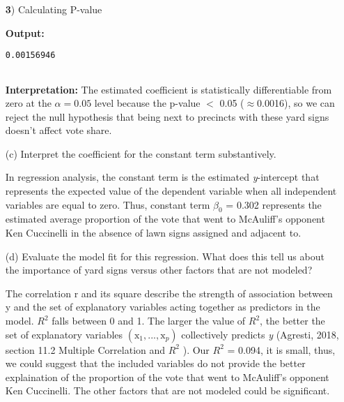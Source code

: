 \documentclass[12pt,letterpaper]{article}
\begin{document}
\begin{enumerate}
\begin{verbatim}
\end{verbatim}  
\vspace{.25cm}

\noindent \textbf 3) Calculating P-value
\vspace{0.5cm}


  
\vspace{.25cm}

\noindent \textbf{Output: }
\begin{verbatim}
0.00156946
	
\end{verbatim}  
\vspace{.25cm}

\noindent \textbf{Interpretation:} The estimated coefficient is statistically differentiable from zero at the $\alpha=0.05$ level because the p-value $<$ 0.05 ($\approx $0.0016), so we can reject the null hypothesis that being next to precincts with these yard signs doesn't affect vote share. \vspace{.5cm}
		

	\item [(c)] Interpret the coefficient for the constant term substantively.
	\vspace{0.5 cm}
	
	\noindent In regression analysis, the constant term is the estimated \textit{y}-intercept that represents the expected value of the dependent variable when all independent variables are equal to zero. Thus, constant term $ \beta_0 $ = 0.302 represents the estimated average proportion of the vote that went to McAuliff’s opponent Ken Cuccinelli in the absence of lawn signs assigned and adjacent to.
	\vspace{0.5 cm}
	
	\item [(d)] Evaluate the model fit for this regression.  What does this	tell us about the importance of yard signs versus other factors that are not modeled?
	
	\noindent The correlation r and its square describe the strength of association between y and the set of explanatory variables acting together as predictors in the model. $ R^{2} $ falls between 0 and 1. The larger the value of $ R^{2} $, the better the set of explanatory variables $ (\text{x}_1, . . . , \text{x}_p) $ collectively predicts \textit{y} (Agresti, 2018, section 11.2 Multiple Correlation and $ R^{2} $ ). Our $ R^{2} $ = 0.094, it is small, thus, we could suggest that the included variables do not provide the better explaination of the proportion of the vote that went to McAuliff’s opponent Ken Cuccinelli. The other factors that are not modeled could be significant.
	
\end{enumerate}  
\end{document}
